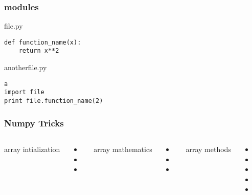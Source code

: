 \begin{frame}[fragile]

    \frametitle{modules}

file.py
\begin{lstlisting}
def function_name(x):
    return x**2

\end{lstlisting}

anotherfile.py
\begin{lstlisting}a
import file
print file.function_name(2)
\end{lstlisting}

\end{frame}


\begin{frame}[fragile]

    \frametitle{Numpy Tricks}


    \begin{columns}[t]


            array intialization

            \begin{itemize}
                \item {}

                \item {}

                \item {}

            \end{itemize}




            array mathematics

            \begin{itemize}
                \item {}
                \item \code{ += }
                \item {}
            \end{itemize}

            array methods

            \begin{itemize}
                \item {}
                \item {}
                \item {}
                \item {}
                \item {}
            \end{itemize}

    \end{columns}

\end{frame}


